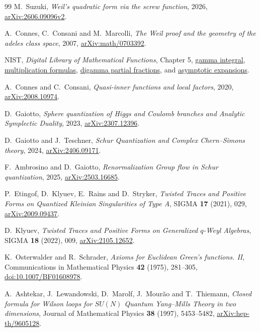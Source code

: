 \begin{thebibliography}{99}
M.~Suzuki, \emph{Weil's quadratic form via the screw function},
2026, \href{https://arxiv.org/abs/2606.09096v2}{arXiv:2606.09096v2}.

A.~Connes, C.~Consani and M.~Marcolli,
\emph{The Weil proof and the geometry of the adeles class space},
2007, \href{https://arxiv.org/abs/math/0703392}{arXiv:math/0703392}.

NIST, \emph{Digital Library of Mathematical Functions}, Chapter 5,
\href{https://dlmf.nist.gov/5.2}{gamma integral},
\href{https://dlmf.nist.gov/5.5}{multiplication formulas},
\href{https://dlmf.nist.gov/5.7}{digamma partial fractions}, and
\href{https://dlmf.nist.gov/5.11}{asymptotic expansions}.

A.~Connes and C.~Consani, \emph{Quasi-inner functions and local factors},
2020, \href{https://arxiv.org/abs/2008.10974}{arXiv:2008.10974}.

D.~Gaiotto, \emph{Sphere quantization of Higgs and Coulomb branches and
Analytic Symplectic Duality},
2023, \href{https://arxiv.org/abs/2307.12396}{arXiv:2307.12396}.

D.~Gaiotto and J.~Teschner, \emph{Schur Quantization and Complex
Chern--Simons theory},
2024, \href{https://arxiv.org/abs/2406.09171}{arXiv:2406.09171}.

F.~Ambrosino and D.~Gaiotto, \emph{Renormalization Group flow in Schur
quantization},
2025, \href{https://arxiv.org/abs/2503.16685}{arXiv:2503.16685}.

P.~Etingof, D.~Klyuev, E.~Rains and D.~Stryker,
\emph{Twisted Traces and Positive Forms on Quantized Kleinian
Singularities of Type A}, SIGMA \textbf{17} (2021), 029,
\href{https://arxiv.org/abs/2009.09437}{arXiv:2009.09437}.

D.~Klyuev, \emph{Twisted Traces and Positive Forms on Generalized
$q$-Weyl Algebras}, SIGMA \textbf{18} (2022), 009,
\href{https://arxiv.org/abs/2105.12652}{arXiv:2105.12652}.

K.~Osterwalder and R.~Schrader, \emph{Axioms for Euclidean Green's
functions. II}, Communications in Mathematical Physics \textbf{42}
(1975), 281--305,
\href{https://doi.org/10.1007/BF01608978}{doi:10.1007/BF01608978}.

A.~Ashtekar, J.~Lewandowski, D.~Marolf, J.~Mour\~ao and T.~Thiemann,
\emph{Closed formula for Wilson loops for $SU(N)$ Quantum Yang--Mills
Theory in two dimensions}, Journal of Mathematical Physics \textbf{38}
(1997), 5453--5482,
\href{https://arxiv.org/abs/hep-th/9605128}{arXiv:hep-th/9605128}.


\end{thebibliography}
